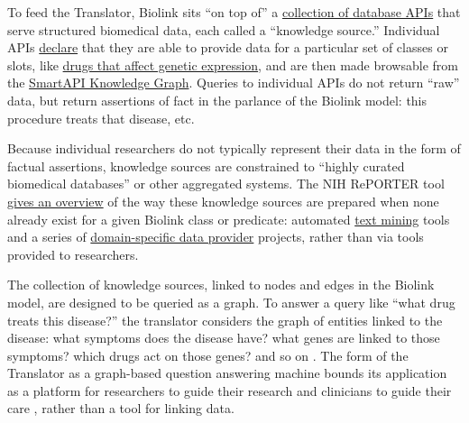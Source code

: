 To feed the Translator, Biolink sits ``on top of'' a
\href{http://www.smart-api.info/registry}{collection of database APIs}
that serve structured biomedical data, each called a ``knowledge
source.'' Individual APIs
\href{https://github.com/NCATSTranslator/ReasonerAPI}{declare} that they
are able to provide data for a particular set of classes or slots, like
\href{http://www.smart-api.info/ui/adf20dd6ff23dfe18e8e012bde686e31}{drugs
that affect genetic expression}, and are then made browsable from the
\href{http://www.smart-api.info/portal/translator/metakg}{SmartAPI
Knowledge Graph}. Queries to individual APIs do not return ``raw'' data,
but return assertions of fact in the parlance of the Biolink model: this
procedure treats that disease, etc.

Because individual researchers do not typically represent their data in
the form of factual assertions, knowledge sources are constrained to
``highly curated biomedical databases'' or other aggregated systems. The
NIH RePORTER tool
\href{https://reporter.nih.gov/search/DShVUhB_ZUq0X5UWFjy5WQ/projects?shared=true}{gives
an overview} of the way these knowledge sources are prepared when none
already exist for a given Biolink class or predicate: automated
\href{https://reporter.nih.gov/project-details/10548337}{text mining}
tools and a series of
\href{https://reporter.nih.gov/project-details/10056962}{domain-specific
data provider} projects, rather than via tools provided to researchers.

The collection of knowledge sources, linked to nodes and edges in the
Biolink model, are designed to be queried as a graph. To answer a query
like ``what drug treats this disease?'' the translator considers the
graph of entities linked to the disease: what symptoms does the disease
have? what genes are linked to those symptoms? which drugs act on those
genes? and so on \citep{renaissancecomputinginstituterenciBiomedicalDataTranslator2022} . The
form of the Translator as a graph-based question answering machine
bounds its application as a platform for researchers to guide their
research and clinicians to guide their care \citep{hailuNIHfundedProjectAims2019} , rather than a tool for linking data.

